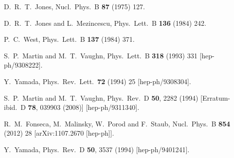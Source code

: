 \documentclass[final,3p,times,pdflatex]{elsarticle}
\begin{document}
\begin{thebibliography}{100}
  D.~R.~T.~Jones,
  Nucl.\ Phys.\ B {\bf 87} (1975) 127.

  D.~R.~T.~Jones and L.~Mezincescu,
  Phys.\ Lett.\ B {\bf 136} (1984) 242.

  P.~C.~West,
  Phys.\ Lett.\ B {\bf 137} (1984) 371.

  S.~P.~Martin and M.~T.~Vaughn,
  Phys.\ Lett.\ B {\bf 318} (1993) 331
  [hep-ph/9308222].

  Y.~Yamada,
  Phys.\ Rev.\ Lett.\  {\bf 72} (1994) 25
  [hep-ph/9308304].

  S.~P.~Martin and M.~T.~Vaughn,
  Phys.\ Rev.\ D {\bf 50}, 2282 (1994)
  [Erratum-ibid.\ D {\bf 78}, 039903 (2008)]
  [hep-ph/9311340].

  R.~M.~Fonseca, M.~Malinsky, W.~Porod and F.~Staub,
  Nucl.\ Phys.\ B {\bf 854} (2012) 28
  [arXiv:1107.2670 [hep-ph]].

  Y.~Yamada,
  Phys.\ Rev.\ D {\bf 50}, 3537 (1994)
  [hep-ph/9401241].


\end{thebibliography}
\end{document}
